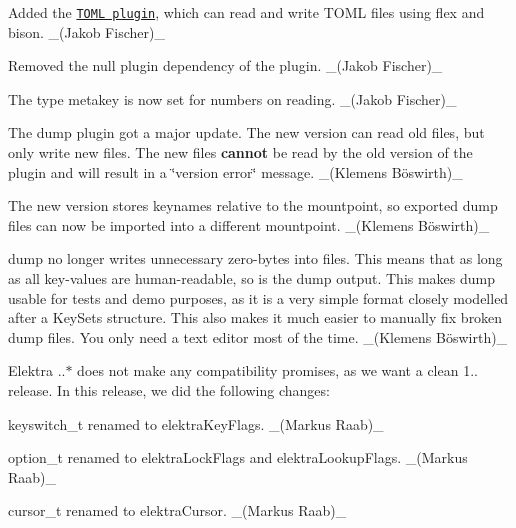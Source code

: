 \begin{DoxyItemize}
\item Added the \href{https://www.libelektra.org/plugins/toml}{\tt T\+O\+ML plugin}, which can read and write T\+O\+ML files using flex and bison. \+\_\+(\+Jakob Fischer)\+\_\+
\item Removed the {\ttfamily null} plugin dependency of the plugin. \+\_\+(\+Jakob Fischer)\+\_\+
\item The {\ttfamily type} metakey is now set for numbers on reading. \+\_\+(\+Jakob Fischer)\+\_\+
\end{DoxyItemize}


\begin{DoxyItemize}
\item The {\ttfamily dump} plugin got a major update. The new version can read old files, but only write new files. The new files {\bfseries cannot} be read by the old version of the plugin and will result in a \char`\"{}version error\char`\"{} message. \+\_\+(Klemens Böswirth)\+\_\+
\item The new version stores keynames relative to the mountpoint, so exported {\ttfamily dump} files can now be imported into a different mountpoint. \+\_\+(Klemens Böswirth)\+\_\+
\item {\ttfamily dump} no longer writes unnecessary zero-\/bytes into files. This means that as long as all key-\/values are human-\/readable, so is the {\ttfamily dump} output. This makes {\ttfamily dump} usable for tests and demo purposes, as it is a very simple format closely modelled after a Key\+Set\textquotesingle{}s structure. This also makes it much easier to manually fix broken {\ttfamily dump} files. You only need a text editor most of the time. \+\_\+(Klemens Böswirth)\+\_\+
\end{DoxyItemize}

Elektra {..$\ast$} does not make any compatibility promises, as we want a clean 1.. release. In this release, we did the following changes\+:


\begin{DoxyItemize}
\item {\ttfamily keyswitch\+\_\+t} renamed to elektra\+Key\+Flags. \+\_\+(\+Markus Raab)\+\_\+
\item {\ttfamily option\+\_\+t} renamed to elektra\+Lock\+Flags and elektra\+Lookup\+Flags. \+\_\+(\+Markus Raab)\+\_\+
\item {\ttfamily cursor\+\_\+t} renamed to elektra\+Cursor. \+\_\+(\+Markus Raab)\+\_\+
\end{DoxyItemize}

